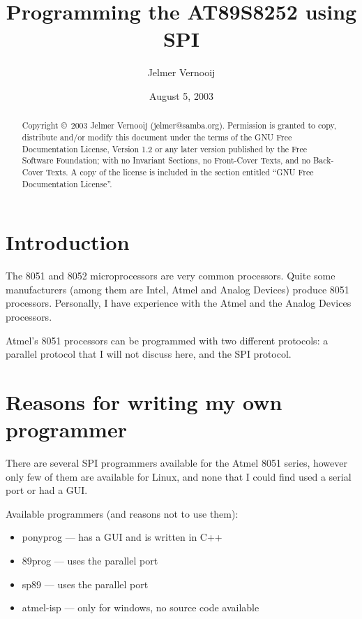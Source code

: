 \documentclass[a4paper]{article}
\begin{document}
\title{Programming the AT89S8252 using SPI}
\date{August 5, 2003}
\author{Jelmer Vernooij}
\maketitle

\begin{abstract}
    Copyright \copyright\ 2003  Jelmer Vernooij (jelmer@samba.org).
    Permission is granted to copy, distribute and/or modify this document
    under the terms of the GNU Free Documentation License, Version 1.2
    or any later version published by the Free Software Foundation;
    with no Invariant Sections, no Front-Cover Texts, and no Back-Cover Texts.
    A copy of the license is included in the section entitled ``GNU
    Free Documentation License''.
\end{abstract}

\lstset{language=C}

\tableofcontents

\section{Introduction}

The 8051 and 8052 microprocessors are very common processors. Quite some 
manufacturers (among them are Intel, Atmel and Analog Devices) produce 8051
processors. Personally, I have experience with the Atmel and the Analog Devices
processors. 

Atmel's 8051 processors can be programmed with two different protocols: 
a parallel protocol that I will not discuss here, and the SPI protocol. 

\section{Reasons for writing my own programmer}

There are several SPI programmers available for the Atmel 8051 series, however
only few of them are available for Linux, and none that I could find used 
a serial port or had a GUI.

Available programmers (and reasons not to use them):

\begin{itemize}
\item ponyprog --- has a GUI and is written in C++
\item 89prog --- uses the parallel port
\item sp89 --- uses the parallel port
\item atmel-isp --- only for windows, no source code available
\end{itemize}
\end{document}
